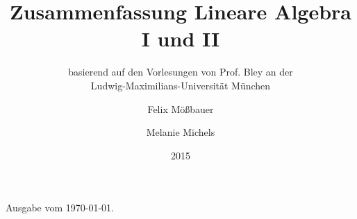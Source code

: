 \documentclass[fontsize=10pt]{scrartcl}
\title{Zusammenfassung Lineare Algebra I und II}
\subtitle{basierend auf den Vorlesungen von Prof. Bley an der\\Ludwig-Maximilians-Universität München}
\author{Felix Mößbauer \and Melanie Michels}
\date{2015}
\theoremstyle{definition}
\begin{document}
\maketitle

\newpage

\singlespacing
\tableofcontents
\onehalfspacing

\vfill
\small {Ausgabe vom \today.}

\newpage

%











\newpage
\renewcommand{\indexname}{Stichwortverzeichnis}

\printindex
\end{document}
